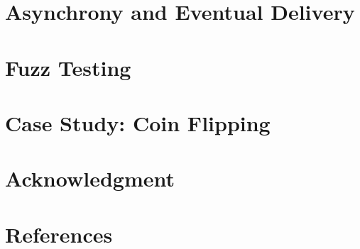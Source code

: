 \documentclass[conference]{IEEEtran}
\begin{document}
\section{Asynchrony and Eventual Delivery} \label{sec:wrappers}


%

%
\section{Fuzz Testing}


\section{Case Study: Coin Flipping}


\section*{Acknowledgment}

\section*{References}

\appendix


\pagebreak
\end{document}
